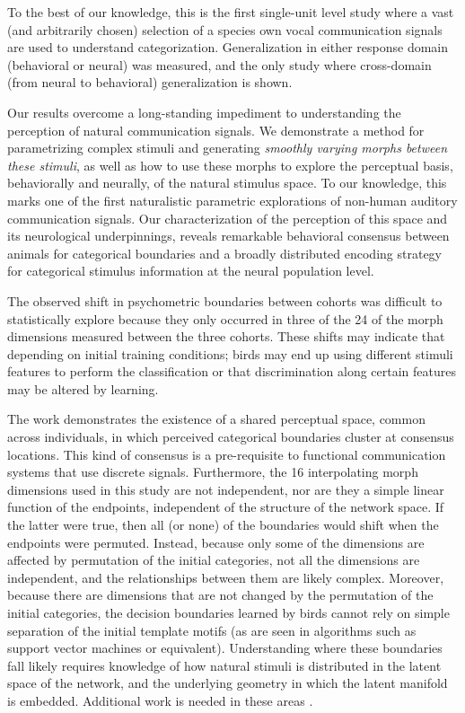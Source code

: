 To the best of our knowledge, this is the first single-unit level study where a vast (and arbitrarily chosen) selection of a species own vocal communication signals are used to understand categorization. Generalization in either response domain (behavioral or neural) was measured, and the only study where cross-domain (from neural to behavioral) generalization is shown.

Our results overcome a long-standing impediment to understanding the perception of natural communication signals. We demonstrate a method for parametrizing complex stimuli and generating \emph{smoothly varying morphs between these stimuli}, as well as how to use these morphs to explore the perceptual basis, behaviorally and neurally, of the natural stimulus space. To our knowledge, this marks one of the first naturalistic parametric explorations of non-human auditory communication signals. Our characterization of the perception of this space and its neurological underpinnings, reveals remarkable behavioral consensus between animals for categorical boundaries and a broadly distributed encoding strategy for categorical stimulus information at the neural population level.  

The observed shift in psychometric boundaries between cohorts was difficult to statistically explore because they only occurred in three of the 24 of the morph dimensions measured between the three cohorts. These shifts may indicate that depending on initial training conditions; birds may end up using different stimuli features to perform the classification or that discrimination along certain features may be altered by learning.

The work demonstrates the existence of a shared perceptual space, common across individuals, in which perceived categorical boundaries cluster at consensus locations.  This kind of consensus is a pre-requisite to functional communication systems that use discrete signals.  Furthermore, the 16 interpolating morph dimensions used in this study are not independent, nor are they a simple linear function of the endpoints, independent of the structure of the network space. If the latter were true, then all (or none) of the boundaries would shift when the endpoints were permuted. Instead, because only some of the dimensions are affected by permutation of the initial categories, not all the dimensions are independent, and the relationships between them are likely complex. Moreover, because there are dimensions that are not changed by the permutation of the initial categories, the decision boundaries learned by birds cannot rely on simple separation of the initial template motifs (as are seen in algorithms such as support vector machines or equivalent). Understanding where these boundaries fall likely requires knowledge of how natural stimuli is distributed in the latent space of the network, and the underlying geometry in which the latent manifold is embedded. Additional work is needed in these areas \cite{sainburg2019parallels}.

